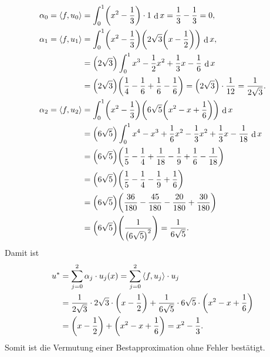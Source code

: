\documentclass[german,12pt]{homework}
\newcommand{\dotproduct}[2]{\left\langle{#1, #2}\right\rangle}
\newcommand{\dd}{\,\differ}
\DeclareMathOperator{\differ}{d}
\DeclarePairedDelimiter{\enbrace}{(}{)}
\begin{document}
    \begin{align*}
        \alpha_0 = \dotproduct{f}{u_0} &= \int_0^1\enbrace*{x^2 - \frac{1}{3}}
        \cdot 1\dd{x} = \frac{1}{3} - \frac{1}{3} = 0,\\
        \alpha_1 = \dotproduct{f}{u_1} &= \int_0^1\enbrace*{x^2 - \frac{1}{3}}
        \enbrace*{2\sqrt{3}\enbrace*{x - \frac{1}{2}}}\dd{x},\\
        &= \enbrace*{2\sqrt{3}}\int_0^1x^3 - \frac{1}{2}x^2 + \frac{1}{3}x -
        \frac{1}{6}\dd{x}\\
        &= \enbrace*{2\sqrt{3}}\enbrace*{\frac{1}{4} - \frac{1}{6} + \frac{1}{6}
        - \frac{1}{6}} = \enbrace*{2\sqrt{3}} \cdot \frac{1}{12} =
        \frac{1}{2\sqrt{3}}.\\
        \alpha_2 = \dotproduct{f}{u_2} &= \int_0^1\enbrace*{x^2 - \frac{1}{3}}
        \enbrace*{6\sqrt{5}\enbrace*{x^2- x + \frac{1}{6}}}\dd{x}\\
        &= \enbrace*{6\sqrt{5}}\int_0^1x^4 - x^3 + \frac{1}{6}x^2 -
        \frac{1}{3}x^2 + \frac{1}{3}x - \frac{1}{18}\dd{x}\\
        &= \enbrace*{6\sqrt{5}}\enbrace*{\frac{1}{5} - \frac{1}{4} + \frac{1}{18} - \frac{1}{9} + \frac{1}{6} - \frac{1}{18}}\\
        &= \enbrace*{6\sqrt{5}}\enbrace*{\frac{1}{5} - \frac{1}{4} - \frac{1}{9}
        + \frac{1}{6}}\\
        &= \enbrace*{6\sqrt{5}}\enbrace*{\frac{36}{180} - \frac{45}{180} -
        \frac{20}{180} + \frac{30}{180}}\\
        &= \enbrace*{6\sqrt{5}}\enbrace*{\frac{1}{\enbrace*{6\sqrt{5}}^2}}
        = \frac{1}{6\sqrt{5}}.
    \end{align*}
    Damit ist
    \begin{align*}
        u^* &= \sum_{j = 0}^2\alpha_j \cdot u_j\enbrace*{x} = \sum_{j = 0}^2
        \dotproduct{f}{u_j} \cdot u_j\\
        &= \frac{1}{2\sqrt{3}} \cdot 2\sqrt{3} \cdot \enbrace*{x - \frac{1}{2}}
        + \frac{1}{6\sqrt{5}} \cdot 6\sqrt{5} \cdot \enbrace*{x^2 - x +
        \frac{1}{6}}\\
        &= \enbrace*{x - \frac{1}{2}} + \enbrace*{x^2 - x + \frac{1}{6}}
        = x^2 - \frac{1}{3}.
    \end{align*}
    Somit ist die Vermutung einer Bestapproximation ohne Fehler bestätigt.
\end{document}
